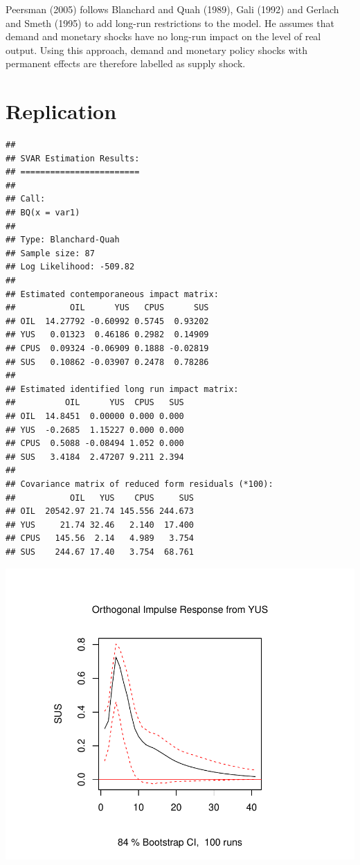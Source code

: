 \documentclass[11pt,preprint, authoryear]{elsarticle}
\numberwithin{equation}{section}
\numberwithin{figure}{section}
\numberwithin{table}{section}
\begin{document}
Peersman (2005) follows Blanchard and Quah (1989), Gali (1992) and
Gerlach and Smeth (1995) to add long-run restrictions to the model. He
assumes that demand and monetary shocks have no long-run impact on the
level of real output. Using this approach, demand and monetary policy
shocks with permanent effects are therefore labelled as supply shock.

\hypertarget{replication}{%
\section{Replication}\label{replication}}

\begin{verbatim}
## 
## SVAR Estimation Results:
## ======================== 
## 
## Call:
## BQ(x = var1)
## 
## Type: Blanchard-Quah 
## Sample size: 87 
## Log Likelihood: -509.82 
## 
## Estimated contemporaneous impact matrix:
##           OIL      YUS   CPUS      SUS
## OIL  14.27792 -0.60992 0.5745  0.93202
## YUS   0.01323  0.46186 0.2982  0.14909
## CPUS  0.09324 -0.06909 0.1888 -0.02819
## SUS   0.10862 -0.03907 0.2478  0.78286
## 
## Estimated identified long run impact matrix:
##          OIL      YUS  CPUS   SUS
## OIL  14.8451  0.00000 0.000 0.000
## YUS  -0.2685  1.15227 0.000 0.000
## CPUS  0.5088 -0.08494 1.052 0.000
## SUS   3.4184  2.47207 9.211 2.394
## 
## Covariance matrix of reduced form residuals (*100):
##           OIL   YUS    CPUS     SUS
## OIL  20542.97 21.74 145.556 244.673
## YUS     21.74 32.46   2.140  17.400
## CPUS   145.56  2.14   4.989   3.754
## SUS    244.67 17.40   3.754  68.761
\end{verbatim}

\includegraphics{replication_files/figure-latex/unnamed-chunk-1-1.pdf}
\end{document}
